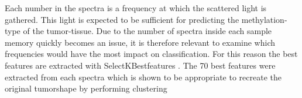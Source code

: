 Each number in the spectra is a frequency at which the scattered light is gathered. This light is expected to be sufficient for predicting the methylation-type of the tumor-tissue. Due to the number of spectra inside each sample memory quickly becomes an issue, it is therefore relevant to examine which frequencies would have the most impact on classification. For this reason the best features are extracted with SelectKBestfeatures \cite{scikit}. The 70 best features were extracted from each spectra which is shown to be appropriate to recreate the original tumorshape by performing clustering 